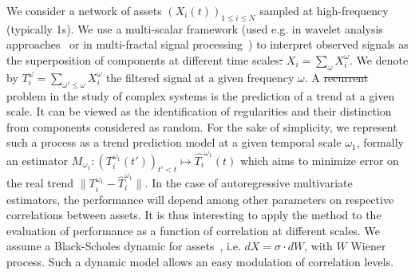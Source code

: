 \documentclass{bmcart}
\newcommand{\norm}[1]{\| #1 \|}
\providecommand{\DIFaddtex}[1]{{\protect\color{blue}\uwave{#1}}} %
\providecommand{\DIFdeltex}[1]{{\protect\color{red}\sout{#1}}}                      %
\providecommand{\DIFaddbegin}{} %
\providecommand{\DIFaddend}{} %
\providecommand{\DIFdelbegin}{} %
\providecommand{\DIFdelend}{} %
\providecommand{\DIFadd}[1]{\texorpdfstring{\DIFaddtex{#1}}{#1}} %
\providecommand{\DIFdel}[1]{\texorpdfstring{\DIFdeltex{#1}}{}} %
\newcommand{\DIFscaledelfig}{0.5}
\newlength{\DIFdelgraphicswidth} %
\newlength{\DIFdelgraphicsheight} %
\newcommand{\DIFaddincludegraphics}[2][]{{\color{blue}\fbox{\DIFOincludegraphics[#1]{#2}}}} %
\newcommand{\DIFdelincludegraphics}[2][]{%
\sbox{\DIFdelgraphicsbox}{\DIFOincludegraphics[#1]{#2}}%
\settoboxwidth{\DIFdelgraphicswidth}{\DIFdelgraphicsbox} %
\settoboxtotalheight{\DIFdelgraphicsheight}{\DIFdelgraphicsbox} %
\scalebox{\DIFscaledelfig}{%
\parbox[b]{\DIFdelgraphicswidth}{\usebox{\DIFdelgraphicsbox}\\[-\baselineskip] \rule{\DIFdelgraphicswidth}{0em}}\llap{\resizebox{\DIFdelgraphicswidth}{\DIFdelgraphicsheight}{%
\setlength{\unitlength}{\DIFdelgraphicswidth}%
\begin{picture}(1,1)%
\thicklines\linethickness{2pt} %
{\color[rgb]{1,0,0}\put(0,0){\framebox(1,1){}}}%
{\color[rgb]{1,0,0}\put(0,0){\line( 1,1){1}}}%
{\color[rgb]{1,0,0}\put(0,1){\line(1,-1){1}}}%
\end{picture}%
}\hspace*{3pt}}} %
} %
\DeclareRobustCommand{\DIFaddbegin}{\DIFOaddbegin \let\includegraphics\DIFaddincludegraphics} %
\DeclareRobustCommand{\DIFaddend}{\DIFOaddend \let\includegraphics\DIFOincludegraphics} %
\DeclareRobustCommand{\DIFdelbegin}{\DIFOdelbegin \let\includegraphics\DIFdelincludegraphics} %
\DeclareRobustCommand{\DIFdelend}{\DIFOaddend \let\includegraphics\DIFOincludegraphics} %
\begin{document}
We consider a network of assets $(X_i(t))_{1\leq i \leq N}$ sampled at high-frequency (typically 1s). We use a multi-scalar framework (used e.g. in wavelet analysis approaches~\cite{ramsey2002wavelets} or in multi-fractal signal processing~\cite{bouchaud2000apparent}) to interpret observed signals as the superposition of components at different time scales\DIFdelbegin \DIFdel{: }\DIFdelend \DIFaddbegin \DIFadd{. We thus write }\DIFaddend $X_i=\sum_{\omega}{X_i^{\omega}}$. We denote by $T_i^{\omega} = \sum_{\omega' \leq \omega} X_i^{\omega}$ the filtered signal at a given frequency $\omega$. A \DIFdelbegin \DIFdel{recurrent }\DIFdelend \DIFaddbegin \DIFadd{typical }\DIFaddend problem in the study of complex systems is the prediction of a trend at a given scale. It can be viewed as the identification of regularities and their distinction from components considered as random. For the sake of simplicity, we represent such a process as a trend prediction model at a given temporal scale $\omega_1$, formally an estimator $M_{\omega_1} : (T_i^{\omega_1}(t'))_{t'<t} \mapsto \hat{T_i}^{\omega_1}(t)$ which aims to minimize error on the real trend $\norm{T_i^{\omega_1} - \hat{T}_i^{\omega_1}}$. In the case of autoregressive multivariate estimators, the performance will depend among other parameters on respective correlations between assets. It is thus interesting to apply the method to the evaluation of performance as a function of correlation at different scales. We assume a Black-Scholes dynamic for assets~\cite{jarrow1999honor}, i.e. $dX = \sigma\cdot dW$, with $W$ Wiener process. Such a dynamic model allows an easy modulation of correlation levels.
\end{document}
